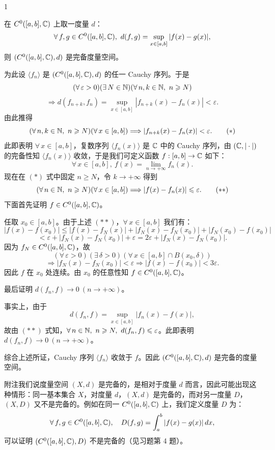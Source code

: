 \begin{sourceexample}{1}

在 $C^0([a,b],\mathbb{C})$ 上取一度量 $d$：
\[\forall\,f,g\in C^0([a,b],\C),\ d(f,g)=\sup_{x\in[a,b]}|f(x)-g(x)|,\]
则 $(C^0([a,b],\mathbb{C}),d)$ 是完备度量空间。

为此设 $\langle f_n\rangle$ 是 $(C^0([a,b],\mathbb{C}),d)$ 的任一 Cauchy 序列。于是
\[(\forall\,\varepsilon>0)(\exists\,N\in\N)(\forall\,n,k\in\N,\ n\geqslant N)\]
\[\Longrightarrow d(f_{n+k},f_n)=\sup_{x\in[a,b]}|f_{n+k}(x)-f_n(x)|<\varepsilon.\]
由此推得
\[(\forall\,n,k\in\mathbb{N},\ n\geqslant N)(\forall\,x\in[a,b])\Longrightarrow|f_{n+k}(x)-f_n(x)|<\varepsilon.\qquad(*)\]
此即表明 $\forall\,x\in[a,b]$，复数序列 $\langle f_n(x)\rangle$ 是 $\mathbb{C}$ 中的 Cauchy 序列，由 $(\mathbb{C},|\cdot|)$ 的完备性知 $\langle f_n(x)\rangle$ 收敛，于是我们可定义函数 $f:[a,b]\to\mathbb{C}$ 如下：
\[\forall\,x\in[a,b],\ f(x)=\lim_{n\to+\infty}f_n(x).\]
现在在 $(*)$ 式中固定 $n\geqslant N$，令 $k\to+\infty$ 得到
\[(\forall\,n\in\mathbb{N},\ n\geqslant N)(\forall\,x\in[a,b])\Longrightarrow|f(x)-f_n(x)|\leqslant\varepsilon.\qquad(**)\]
下面首先证明 $f\in C^0([a,b],\mathbb{C})$。

任取 $x_0\in[a,b]$。由于上述 $(**)$，$\forall\,x\in[a,b]$ 我们有：
\[|f(x)-f(x_0)|\leqslant|f(x)-f_N(x)|+|f_N(x)-f_N(x_0)|+|f_N(x_0)-f(x_0)|\]
\[<\varepsilon+|f_N(x)-f_N(x_0)|+\varepsilon=2\varepsilon+|f_N(x)-f_N(x_0)|.\]
因为 $f_N\in C^0([a,b],\mathbb{C})$，故
\[(\forall\,\varepsilon>0)(\exists\,\delta>0)(\forall\,x\in[a,b]\cap B(x_0,\delta))\]
\[\Longrightarrow|f_N(x)-f_N(x_0)|<\varepsilon\Longrightarrow|f(x)-f(x_0)|<3\varepsilon.\]
因此 $f$ 在 $x_0$ 处连续。由 $x_0$ 的任意性知 $f\in C^0([a,b],\mathbb{C})$。

最后证明 $d(f_n,f)\to0\ (n\to+\infty)$。

事实上，由于
\[d(f_n,f)=\sup_{x\in[a,b]}|f_n(x)-f(x)|,\]
故由 $(**)$ 式知，$\forall\,n\in\N,\ n\geqslant N,\ d(f_n,f)\leqslant\varepsilon$。此即表明 $d(f_n,f)\to0\ (n\to+\infty)$。

综合上述所证，Cauchy 序列 $\langle f_n\rangle$ 收敛于 $f$。因此 $(C^0([a,b],\mathbb{C}),d)$ 是完备的度量空间。

\end{sourceexample}

附注\quad 我们说度量空间 $(X,d)$ 是完备的，是相对于度量 $d$ 而言，因此可能出现这种情形：同一基本集合 $X$，对度量 $d$，$(X,d)$ 是完备的，而对另一度量 $D$，$(X,D)$ 又不是完备的。例如在同一 $C^0([a,b],\mathbb{C})$ 上，我们定义度量 $D$ 为：
\[\forall\,f,g\in C^0([a,b],\mathbb{C}),\quad D(f,g)=\int_a^b|f(x)-g(x)|\,dx,\]
可以证明 $(C^0([a,b],\mathbb{C}),D)$ 不是完备的（见习题第 4 题）。


